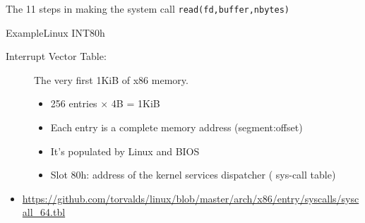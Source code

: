 \begin{frame}
  \begin{center}
  \end{center}
\end{frame}

\begin{frame}%
  \begin{center}
  \end{center}
\end{frame}


\begin{frame}
  \begin{iblock}{The 11 steps in making the system call \texttt{read(fd,buffer,nbytes)}}
    \begin{center}
    \end{center}
  \end{iblock}
\end{frame}

\begin{frame}{Example}{Linux INT80h}
  \begin{description}
  \item[Interrupt Vector Table:] The very first 1KiB of x86 memory. 
    \begin{itemize} 
    \item 256 entries $\times$ 4B = 1KiB
    \item Each entry is a complete memory address (segment:offset)
    \item It's populated by Linux and BIOS
    \item Slot 80h: address of the kernel services dispatcher ({\pright} sys-call table)
    \end{itemize}
  \end{description}
\end{frame}

\begin{itemize}
\item \url{https://github.com/torvalds/linux/blob/master/arch/x86/entry/syscalls/syscall_64.tbl}
\end{itemize}

